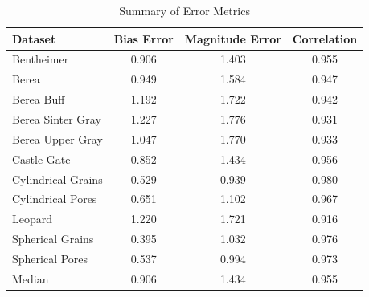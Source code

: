 \begin{table}[h!]
    \centering
    \caption{Summary of Error Metrics}
    \label{tab:metrics_summary}
\begin{tabular}{lccc}
\toprule
Dataset & Bias Error & Magnitude Error & Correlation \\
\midrule
Bentheimer & 0.906 & 1.403 & 0.955 \\
Berea & 0.949 & 1.584 & 0.947 \\
Berea Buff & 1.192 & 1.722 & 0.942 \\
Berea Sinter Gray & 1.227 & 1.776 & 0.931 \\
Berea Upper Gray & 1.047 & 1.770 & 0.933 \\
Castle Gate & 0.852 & 1.434 & 0.956 \\
Cylindrical Grains & 0.529 & 0.939 & 0.980 \\
Cylindrical Pores & 0.651 & 1.102 & 0.967 \\
Leopard & 1.220 & 1.721 & 0.916 \\
Spherical Grains & 0.395 & 1.032 & 0.976 \\
Spherical Pores & 0.537 & 0.994 & 0.973 \\
\hline
Median & 0.906 & 1.434 & 0.955 \\
\bottomrule
\end{tabular}
\end{table}
